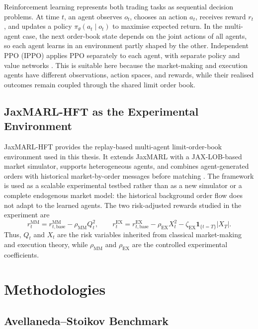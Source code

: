 \documentclass[oneside]{uva-inf-bachelor-thesis}
\begin{document}
Reinforcement learning represents both trading tasks as sequential decision problems.
At time \(t\), an agent observes \(o_t\), chooses an action \(a_t\), receives reward
\(r_t\), and updates a policy \(\pi_\theta(a_t\mid o_t)\) to maximise expected return.
In the multi-agent case, the next order-book state depends on the joint actions of all
agents, so each agent learns in an environment partly shaped by the other.
Independent PPO (IPPO) applies PPO separately to each agent, with separate policy
and value networks \cite{de_witt_independent_2020}. This is suitable here because
the market-making and execution agents have different observations, action spaces,
and rewards, while their realised outcomes remain coupled through the shared limit
order book.

\section{JaxMARL-HFT as the Experimental Environment}
\label{sec:jaxmarl_hft}

JaxMARL-HFT provides the replay-based multi-agent limit-order-book environment
used in this thesis. It extends JaxMARL with a JAX-LOB-based market simulator,
supports heterogeneous agents, and combines agent-generated orders with historical
market-by-order messages before matching
\cite{mohl_jaxmarl-hft_2025,frey_jax-lob_2023,rutherford_jaxmarl_2023}. The
framework is used as a scalable experimental testbed rather than as a new simulator
or a complete endogenous market model: the historical background order flow does
not adapt to the learned agents. The two risk-adjusted rewards studied in the
experiment are
\begin{equation}
    r_t^{\mathrm{MM}} = r_{t,\mathrm{base}}^{\mathrm{MM}} - \rho_{\mathrm{MM}}Q_t^2,
    \qquad
    r_t^{\mathrm{EX}} = r_{t,\mathrm{base}}^{\mathrm{EX}} - \rho_{\mathrm{EX}}X_t^2
    - \zeta_{\mathrm{EX}}\mathbf{1}_{\{t=T\}}|X_T|.
    \label{eq:unified_rl_rewards}
\end{equation}
Thus, \(Q_t\) and \(X_t\) are the risk variables inherited from classical market-making
and execution theory, while \(\rho_{\mathrm{MM}}\) and \(\rho_{\mathrm{EX}}\) are the
controlled experimental coefficients.


\chapter{Methodologies}
\label{chap:methodologies}

\section{Avellaneda--Stoikov Benchmark}
\label{sec:as_benchmark}
\end{document}
